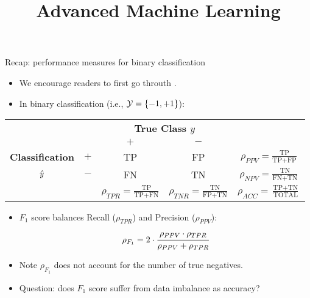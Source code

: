 \documentclass[11pt,compress,t,notes=noshow, xcolor=table]{beamer}
\title{Advanced Machine Learning}
\date{}
\begin{document}



\sloppy

\begin{vbframe}{Recap: performance measures for binary classification}
    \footnotesize{
        \begin{itemize}
            \item We encourage readers to first go throuth \href{https://slds-lmu.github.io/i2ml/chapters/04_evaluation/04-08-measures-classification/}{}.
            \item In binary classification  (i.e., $\mathcal{Y} = \{-1,+1\}$):

		\end{itemize}
		
		\begin{center}
		\tiny
		\renewcommand{\arraystretch}{1.1}
		\begin{tabular}{cc||cc|c}
			& & \multicolumn{2}{c|}{\bfseries True Class $y$} & \\
			& & $+$ & $-$ & \\ 
			\hline \hline
			\bfseries Classification     & $+$ & TP & FP & $\rho_{PPV} = \frac{\text{TP}}{\text{TP} + \text{FP}}$\\
			$\hat{y}$ & $-$ & FN & TN & $\rho_{NPV} = \frac{\text{TN}}{\text{FN} + \text{TN}}$\\
			\hline
			& & $\rho_{TPR} = \frac{\text{TP}}{\text{TP} + \text{FN}}$ & $\rho_{TNR} = \frac{\text{TN}}{\text{FP} + \text{TN}}$ & $\rho_{ACC} = \frac{\text{TP}+ \text{TN}}{\text{TOTAL}}$
		\end{tabular}
		\renewcommand{\arraystretch}{1}
        \end{center}

        \begin{itemize}
            \item $F_1$ score balances Recall ($\rho_{TPR}$) and Precision ($\rho_{PPV}$):
            $$\rho_{F_1} = 2 \cdot \cfrac{\rho_{PPV} \cdot \rho_{TPR}}{\rho_{PPV} + \rho_{TPR}}$$
            
            \item Note $\rho_{F_1}$ does not account for the number of true negatives.
            
            \item Question: does $F_1$ score suffer from data imbalance as accuracy?
        \end{itemize}
            
    }
    
\end{vbframe}
\end{document}
